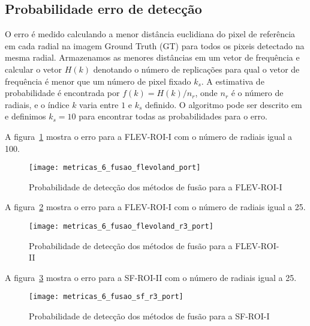 \subsection{Probabilidade erro de detecção}

O erro é medido calculando a menor distância euclidiana do pixel de referência em cada radial na imagem Ground Truth (GT) para todos os pixeis detectado na mesma radial. Armazenamos as menores distâncias em um vetor de frequência e calcular o vetor $H(k)$ denotando o número de replicações para qual o vetor de frequência é menor que um número de pixel fixado $k_s$. A estimativa de probabilidade é encontrada por $f(k)={H(k)}/{n_r}$, onde  $n_r$ é o número de radiais, e o índice $k$ varia entre $1$ e $k_s$ definido. O algoritmo pode ser descrito em \citet{fbgm} e definimos $k_s=10$ para encontrar todas as probabilidades para o erro.     

A figura~\ref{probability_edge_detc_flev_roi_i} mostra o erro para a FLEV-ROI-I com o número de radiais igual a 100.
\begin{figure}[hbt]
\centering
	\texttt{[image: metricas\_6\_fusao\_flevoland\_port]}
	\caption{Probabilidade de detecção dos métodos de fusão para a FLEV-ROI-I}
\label{probability_edge_detc_flev_roi_i}
\end{figure}

A figura~\ref{probability_edge_detc_flev_roi_ii} mostra o erro para a FLEV-ROI-I com o número de radiais igual a 25.
\begin{figure}[H]
\centering
	\texttt{[image: metricas\_6\_fusao\_flevoland\_r3\_port]}
    \caption{Probabilidade de detecção dos métodos de fusão para a FLEV-ROI-II}	 
\label{probability_edge_detc_flev_roi_ii}
\end{figure}

A figura~\ref{probability_edge_detc_sf_roi_i} mostra o erro para a SF-ROI-II com o número de radiais igual a 25.
\begin{figure}[hbt]
\centering
	\texttt{[image: metricas\_6\_fusao\_sf\_r3\_port]}
	 \caption{Probabilidade de detecção dos métodos de fusão para a SF-ROI-I}	  
\label{probability_edge_detc_sf_roi_i}
\end{figure}



